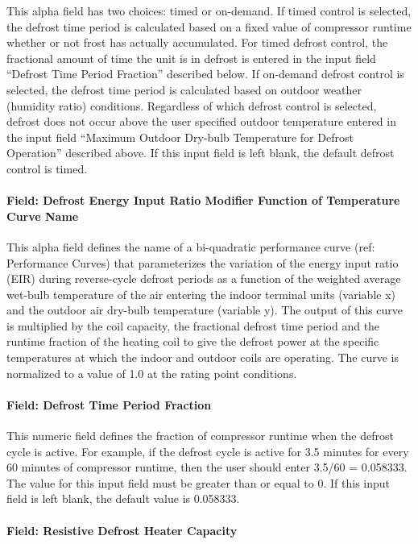 This alpha field has two choices: timed or on-demand. If timed control is selected, the defrost time period is calculated based on a fixed value of compressor runtime whether or not frost has actually accumulated. For timed defrost control, the fractional amount of time the unit is in defrost is entered in the input field ``Defrost Time Period Fraction'' described below. If on-demand defrost control is selected, the defrost time period is calculated based on outdoor weather (humidity ratio) conditions. Regardless of which defrost control is selected, defrost does not occur above the user specified outdoor temperature entered in the input field ``Maximum Outdoor Dry-bulb Temperature for Defrost Operation'' described above. If this input field is left blank, the default defrost control is timed.

\paragraph{Field: Defrost Energy Input Ratio Modifier Function of Temperature Curve Name}

This alpha field defines the name of a bi-quadratic performance curve (ref: Performance Curves) that parameterizes the variation of the energy input ratio (EIR) during reverse-cycle defrost periods as a function of the weighted average wet-bulb temperature of the air entering the indoor terminal units (variable x) and the outdoor air dry-bulb temperature (variable y). The output of this curve is multiplied by the coil capacity, the fractional defrost time period and the runtime fraction of the heating coil to give the defrost power at the specific temperatures at which the indoor and outdoor coils are operating. The curve is normalized to a value of 1.0 at the rating point conditions.

\paragraph{Field: Defrost Time Period Fraction}

This numeric field defines the fraction of compressor runtime when the defrost cycle is active. For example, if the defrost cycle is active for 3.5 minutes for every 60 minutes of compressor runtime, then the user should enter 3.5/60 = 0.058333. The value for this input field must be greater than or equal to 0. If this input field is left blank, the default value is 0.058333.

\paragraph{Field: Resistive Defrost Heater Capacity}

